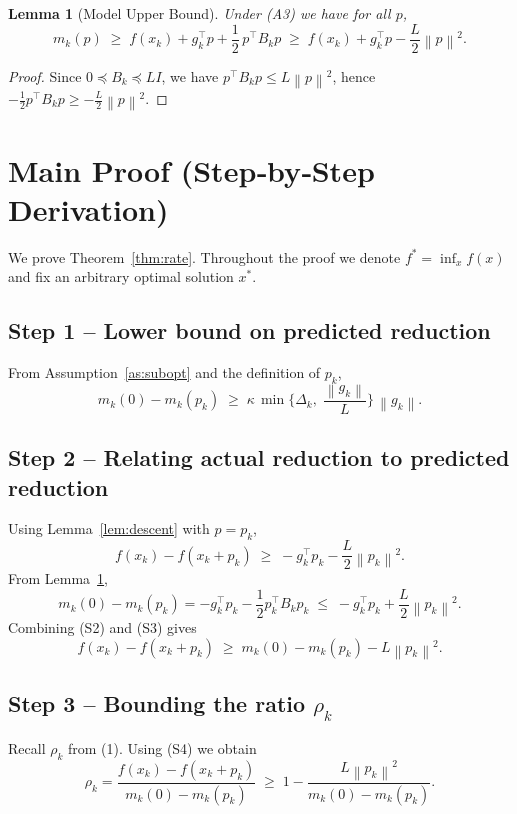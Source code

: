 \documentclass[11pt]{article}
\newtheorem{lemma}{Lemma}
\newcommand{\norm}[1]{\left\lVert #1\right\rVert}
\begin{document}
\begin{lemma}[Model Upper Bound]\label{lem:model}
Under (A3) we have for all $p$,
\[
m_{k}(p)\;\ge\; f(x_{k})+g_{k}^{\top}p+\frac12\,p^{\top}B_{k}p
   \;\ge\; f(x_{k})+g_{k}^{\top}p-\frac{L}{2}\norm{p}^{2}.
\tag{L2}
\]
\end{lemma}
\begin{proof}
Since $0\preceq B_{k}\preceq L I$, we have $p^{\top}B_{k}p\le L\norm{p}^{2}$,
hence $-\frac12p^{\top}B_{k}p\ge -\frac{L}{2}\norm{p}^{2}$.
\end{proof}

\section*{Main Proof (Step‑by‑Step Derivation)}
We prove Theorem~\ref{thm:rate}. Throughout the proof we denote
$f^{*}= \inf_{x} f(x)$ and fix an arbitrary optimal solution $x^{*}$.

\subsection*{Step 1 – Lower bound on predicted reduction}
From Assumption~\ref{as:subopt} and the definition of $p_{k}$,
\[
m_{k}(0)-m_{k}(p_{k})
   \;\ge\;\kappa\,\min\!\Big\{\Delta_{k},\;\frac{\norm{g_{k}}}{L}\Big\}\,\norm{g_{k}}.
\tag{S1}
\]

\subsection*{Step 2 – Relating actual reduction to predicted reduction}
Using Lemma~\ref{lem:descent} with $p=p_{k}$,
\[
f(x_{k})-f(x_{k}+p_{k})
   \;\ge\; -g_{k}^{\top}p_{k}-\frac{L}{2}\norm{p_{k}}^{2}.
\tag{S2}
\]
From Lemma~\ref{lem:model},
\[
m_{k}(0)-m_{k}(p_{k})
   =-g_{k}^{\top}p_{k}-\frac12 p_{k}^{\top}B_{k}p_{k}
   \;\le\; -g_{k}^{\top}p_{k}+\frac{L}{2}\norm{p_{k}}^{2}.
\tag{S3}
\]
Combining (S2) and (S3) gives
\[
f(x_{k})-f(x_{k}+p_{k})
   \;\ge\; m_{k}(0)-m_{k}(p_{k}) - L\norm{p_{k}}^{2}.
\tag{S4}
\]

\subsection*{Step 3 – Bounding the ratio $\rho_{k}$}
Recall $\rho_{k}$ from (1). Using (S4) we obtain
\[
\rho_{k}
   =\frac{f(x_{k})-f(x_{k}+p_{k})}{m_{k}(0)-m_{k}(p_{k})}
   \;\ge\; 1 - \frac{L\norm{p_{k}}^{2}}
                 {m_{k}(0)-m_{k}(p_{k})}.
\tag{S5}
\]
\end{document}
